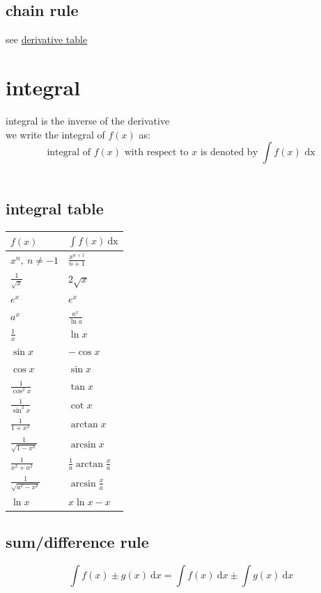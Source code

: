 \documentclass[a4paper,12pt]{article}
\newcommand\dif[1]{\:\textrm{d}#1}
\newcommand{\?}{\stackrel{?}{=}}
\begin{document}
\subsection{chain rule}
\label{sec:org9cdf5b8}
see \hyperref[sec:orgcd100f2]{derivative table}\\[0pt]
\section{integral}
\label{sec:orgdba2ffa}
\begin{definition}
integral is the inverse of the derivative\\[0pt]
we write the integral of \(f(x)\) as:\\[0pt]
\[ \text{integral of $f(x)$ with respect to $x$ is denoted by } \int f(x) \text{ dx} \]\\[0pt]
\end{definition}
\subsection{integral table}
\label{sec:orgb3a8bdb}
\begin{tabular}{ll}
\(f(x)\) & \(\int{f(x) \ \mathrm{dx}}\)\\[0pt]
\hline
\(x^n,\ n \neq -1\) & \(\frac{x^{n+1}}{n+1}\)\\[0pt]
\(\frac{1}{\sqrt{x}}\) & \(2\sqrt{x}\)\\[0pt]
\(e^x\) & \(e^x\)\\[0pt]
\(a^x\) & \(\frac{a^x}{\ln{a}}\)\\[0pt]
\(\frac{1}{x}\) & \(\ln{x}\)\\[0pt]
\(\sin{x}\) & \(-\cos{x}\)\\[0pt]
\(\cos{x}\) & \(\sin{x}\)\\[0pt]
\(\frac{1}{\cos^2{x}}\) & \(\tan{x}\)\\[0pt]
\(\frac{1}{\sin^2{x}}\) & \(\cot{x}\)\\[0pt]
\(\frac{1}{1+x^2}\) & \(\arctan{x}\)\\[0pt]
\(\frac{1}{\sqrt{1-x^2}}\) & \(\arcsin{x}\)\\[0pt]
\(\frac{1}{x^2+a^2}\) & \(\frac1a \arctan{\frac{x}{a}}\)\\[0pt]
\(\frac{1}{\sqrt{a^2-x^2}}\) & \(\arcsin{\frac{x}{a}}\)\\[0pt]
\(\ln x\) & \(x\ln x - x\)\\[0pt]
\end{tabular}
\subsection{sum/difference rule}
\label{sec:org89948e1}
\[
  \int f(x) \pm g(x) \dif{x} = \int f(x) \dif{x} \pm \int g(x) \dif{x}
\]\\[0pt]
\end{document}
